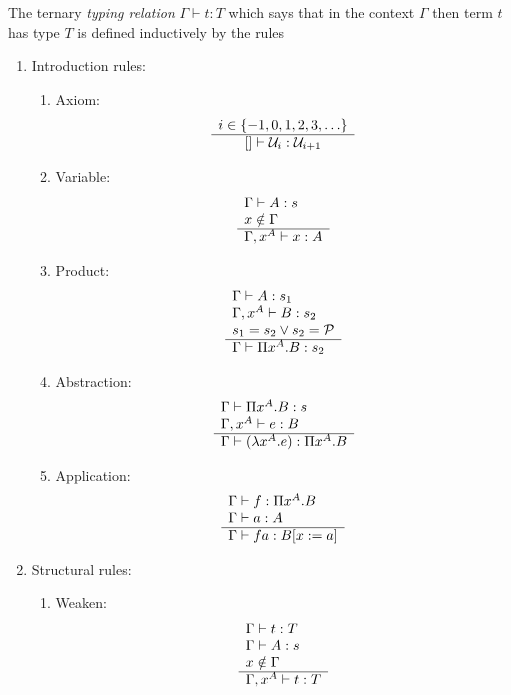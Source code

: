 \begin{definition}
The ternary \emph{typing relation} $\Gamma \vdash t: T$ which says that in
the context $\Gamma$ then term $t$ has type $T$ is defined inductively by
the rules
\begin{enumerate}
    \item Introduction rules:
    \begin{enumerate}
        \item Axiom:
            $$
            \begin{array}{c} i \in \{-1, 0, 1, 2, 3, \ldots \} \\ \hline  [] \vdash {\cal U}_i : {\cal U}_{i + 1}\end{array}
            $$

        \item Variable:
            $$
            \begin{array}{l} 
                \Gamma \vdash A: s
                \\
                x \notin \Gamma
             \\ \hline 
                \Gamma, x^A \vdash x: A
            \end{array}
            $$

        \item Product:
            $$
            \begin{array}{l} 
                \Gamma \vdash A: s_1
                \\
                \Gamma, x^A \vdash B: s_2
                \\
                s_1 = s_2 \lor s_2 = {\cal P}
             \\ \hline 
                \Gamma \vdash \Pi x^A.B : s_2
            \end{array}
            $$

        \item Abstraction:
            $$
            \begin{array}{l} 
                \Gamma \vdash \Pi x^A. B: s
                \\
                \Gamma, x^A \vdash e: B
             \\ \hline 
                \Gamma \vdash (\lambda x^A. e): \Pi x^A. B
            \end{array}
            $$

        \item Application:
            $$
            \begin{array}{l} 
                \Gamma \vdash f: \Pi x^A. B
                \\
                \Gamma \vdash a: A
             \\ \hline 
                \Gamma \vdash f a: B[x:=a]
            \end{array}
            $$
    \end{enumerate}


    \item Structural rules:
        \begin{enumerate}
            \item Weaken:
                $$
                \begin{array}{l} 
                    \Gamma \vdash t: T
                    \\
                    \Gamma \vdash A: s
                    \\
                    x \notin \Gamma
                 \\ \hline 
                    \Gamma, x^A \vdash t: T
                \end{array}
                $$


\end{enumerate}
\end{enumerate}
\end{definition}
